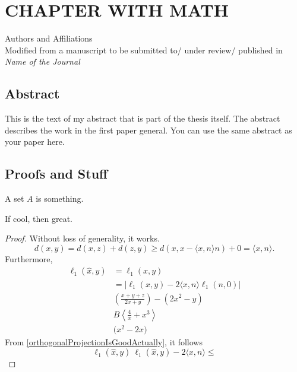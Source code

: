 \newcommand{\RipsD}{\operatorname{Rips}_1}
\newcommand{\Rips}{\operatorname{Rips}}
\newcommand{\ver}{\operatorname{ver}}
\newcommand{\diam}{\operatorname{Diam}}
\newcommand{\midR}{\operatorname{mid}}
\newcommand{\dN}{N_1^*}

\chapter{CHAPTER WITH MATH}
\begin{center}
  Authors and Affiliations \\
  Modified from a manuscript to be submitted to/ under review/ published in \textit{Name of the Journal}
\end{center}

\section{Abstract}
This is the text of my abstract that is part of the thesis itself.
The abstract describes the work in the first paper general. You can use the same abstract as your paper here.
\section{Proofs and Stuff}
\begin{definition}
  A set $A$ is something.
\end{definition}

\begin{lemma}
  If cool, then great.
\end{lemma}
\begin{proof}
  Without loss of generality, it works.
  \begin{equation}
    \label{orthogonalProjectionIsGoodActually}
    d(x,y)= d(x,z)+d(z,y) \geq d(x,x-\langle x,n\rangle n )+0 = \langle x,n\rangle.
  \end{equation}
  Furthermore,
  \begin{align}
    \ell_1(\hat{x},y) & = \ell_1 (x,y)                                        \\
                      & =|\ell_1(x,y)-2\langle x,n\rangle \ell_1(n,0)|        \\
                      & \left(\frac{x+y+z}{2x+y}\right) - \left(2x^2-y\right) \\
                      & B\left\langle \frac{4}{x}+x^3\right\rangle            \\
                      & \Bigg(x^2-2x\Bigg)
  \end{align}
  From \autoref{orthogonalProjectionIsGoodActually}, it follows \[\ell_1(\hat{x},y)\ \ell_1(\hat{x},y)-2\langle x,n\rangle \leq\]
\end{proof}

